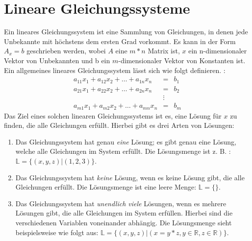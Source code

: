 \documentclass[a4paper, 12pt]{report}
\begin{document}
\begin{sloppypar}
\section{Lineare Gleichungssysteme}
Ein lineares Gleichungssystem ist eine Sammlung von Gleichungen, in denen jede Unbekannte mit höchstens dem ersten Grad vorkommt.
Es kann in der Form $ A_x = b $ geschrieben werden, wobei $A$ eine $ m * n $ Matrix ist, $x$ ein n-dimensionaler Vektor von Unbekannten
und b ein $m$-dimensionaler Vektor von Konstanten ist.
Ein allgemeines lineares Gleichungssystem lässt sich wie folgt definieren. :
\begin{align}
\label{eq:linGle}
    a_{11}x_{1}+ a_{12}x_{2}+\hdots+ a_{1n}x_{n} &=& b_1 \nonumber \\
    a_{21}x_{1}+ a_{22}x_{2}+\hdots+ a_{2n}x_{n} &=& b_2 \nonumber\\
                                                 &\vdots&  \nonumber \\
    a_{m1}x_{1}+ a_{m2}x_2+\hdots+a_{mn}x_{n} &=& b_{m}
\end{align}
\newpage
Das Ziel eines solchen linearen Gleichungssystems ist es, eine Lösung für $x$ zu finden, die alle Gleichungen erfüllt.
Hierbei gibt es drei Arten von Lösungen:
\begin{enumerate}
    \item Das Gleichungssystem hat genau \textit{eine} Lösung; es gibt genau eine Lösung, welche alle Gleichungen im System erfüllt. Die Lösungsmenge ist z. B. : $\mathbb{L} = \{ (x,y,z)| (1,2,3)\} $.
    \item Das Gleichungssystem hat \textit{keine} Lösung, wenn es keine Lösung gibt, die alle Gleichungen erfüllt. Die Lösungsmenge ist eine leere Menge: $\mathbb{L} = \{ \}$.
    \item Das Gleichungssystem hat \textit{unendlich viele} Lösungen, wenn es mehrere Lösungen gibt, die alle Gleichungen im System erfüllen.
        Hierbei sind die verschiedenen Variablen voneinander abhängig. Die Lösungsmenge sieht beispielsweise wie folgt aus: \newline $ \mathbb{L} = \{(x, y, z)| (x = y * z, y\in \mathbb{R}, z \in \mathbb{R}) \} $.
\end{enumerate}



\end{sloppypar}
\end{document}
